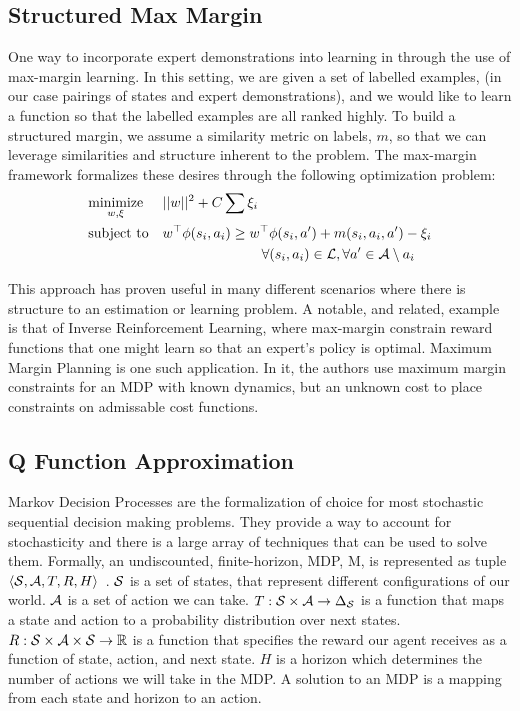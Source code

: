 \subsection{Structured Max Margin}
One way to incorporate expert demonstrations into learning in through the use of max-margin learning.
In this setting, we are given a set of labelled examples,  (in our case pairings of states and expert demonstrations), and we would 
like to learn a function so that the labelled examples are all ranked highly.
To build a structured margin, we assume a similarity metric on labels, $m$,  so that we can leverage 
similarities and structure inherent to the problem.
The max-margin framework formalizes these desires through the following optimization problem:
\begin{equation}
\begin{aligned}
& \underset{w, \xi}{\text{minimize}}  & & ||w||^2 + C\sum \xi_i\\
& \text{subject to} & &w^\top \phi(s{}_i, a{}_i) \geq w^\top \phi(s{}_i, a{}') + m(s{}_i, a{}_i, a{}') - \xi_i 
\\&&&\hspace{2.5cm}\forall (s{}_i, a{}_i) \in \mathcal{L}{}, \forall a{}' \in \mathcal{A}{}\setminus a{}_i
\end{aligned}
\end{equation}


This approach has proven useful in many different scenarios where there is structure to an estimation or learning problem.
A notable, and related, example is that of Inverse Reinforcement Learning, where max-margin constrain reward functions that one might learn so that an expert's policy is optimal.
Maximum Margin Planning is one such application. 
In it, the authors use maximum margin constraints for an MDP with known dynamics, but an unknown cost to place constraints on admissable cost functions.
\subsection{Q Function Approximation}
Markov Decision Processes are the formalization of choice for most stochastic sequential decision making problems.
They provide a way to account for stochasticity and there is a large array of techniques that can be used to solve them.
Formally, an undiscounted, finite-horizon, MDP, M, is represented as tuple $\langle\mathcal{S},\mathcal{A},T,R, H\rangle$~\cite{puterman1994}.
$\mathcal{S}{}$ is a set of states, that represent different configurations of our world.
$\mathcal{A}{}$ is a set of action we can take.
$T:\mathcal{S}{} \times \mathcal{A}{} \rightarrow \Delta_{\mathcal{S}{}}$ is a function that maps a state and action to a probability distribution over next states.
$R:\mathcal{S}{}\times \mathcal{A}{} \times \mathcal{S}{} \rightarrow \mathbb{R}$ is a function that specifies the reward our agent receives as a function of state, action, and next state.
$H$ is a horizon which determines the number of actions we will take in the MDP.
A solution to an MDP is a mapping from each state and horizon to an action.

